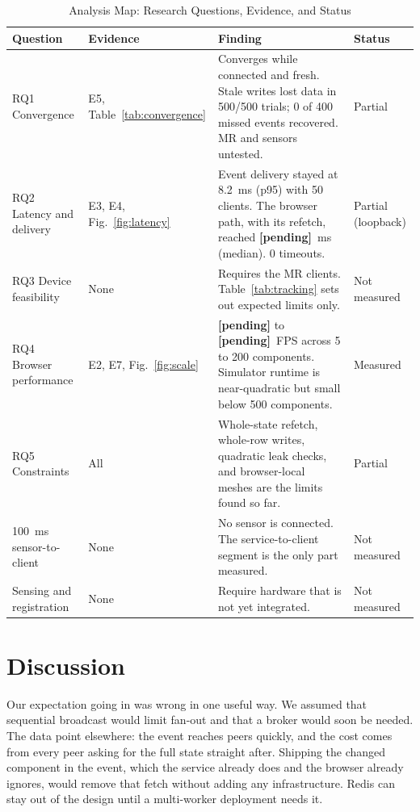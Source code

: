 \documentclass[conference]{IEEEtran}
\newcommand{\fanEventPninetyfiveF}{8.2}
\newcommand{\fanTimeouts}{0}
\newcommand{\lostTrials}{500}
\newcommand{\lostConc}{500}
\newcommand{\awaySent}{400}
\newcommand{\awayReplayed}{0}
\newcommand{\fanGetPfiftyF}{\textbf{[pending]}}
\newcommand{\fpsIdleFive}{\textbf{[pending]}}
\newcommand{\fpsSimTwoHundred}{\textbf{[pending]}}
\begin{document}
\begin{table}[t]
\caption{Analysis Map: Research Questions, Evidence, and Status}
\label{tab:analysis}
\centering
\footnotesize
\begin{tabularx}{\textwidth}{@{}p{}p{}Yp{0.11\textwidth}@{}}
\toprule
\textbf{Question} & \textbf{Evidence} & \textbf{Finding} & \textbf{Status}\\
\midrule
RQ1 Convergence & E5, Table~\ref{tab:convergence} & Converges while connected and fresh. Stale writes lost data in \lostConc{}/\lostTrials{} trials; \awayReplayed{} of \awaySent{} missed events recovered. MR and sensors untested. & Partial\\
RQ2 Latency and delivery & E3, E4, Fig.~\ref{fig:latency} & Event delivery stayed at \fanEventPninetyfiveF~ms (p95) with 50 clients. The browser path, with its refetch, reached \fanGetPfiftyF~ms (median). \fanTimeouts{} timeouts. & Partial (loopback)\\
RQ3 Device feasibility & None & Requires the MR clients. Table~\ref{tab:tracking} sets out expected limits only. & Not measured\\
RQ4 Browser performance & E2, E7, Fig.~\ref{fig:scale} & \fpsIdleFive{} to \fpsSimTwoHundred~FPS across 5 to 200 components. Simulator runtime is near-quadratic but small below 500 components. & Measured\\
RQ5 Constraints & All & Whole-state refetch, whole-row writes, quadratic leak checks, and browser-local meshes are the limits found so far. & Partial\\
100~ms sensor-to-client & None & No sensor is connected. The service-to-client segment is the only part measured. & Not measured\\
Sensing and registration & None & Require hardware that is not yet integrated. & Not measured\\
\bottomrule
\end{tabularx}
\end{table}

\section{Discussion}
Our expectation going in was wrong in one useful way. We assumed that sequential broadcast would limit fan-out and that a broker would soon be needed. The data point elsewhere: the event reaches peers quickly, and the cost comes from every peer asking for the full state straight after. Shipping the changed component in the event, which the service already does and the browser already ignores, would remove that fetch without adding any infrastructure. Redis can stay out of the design until a multi-worker deployment needs it.
\end{document}
